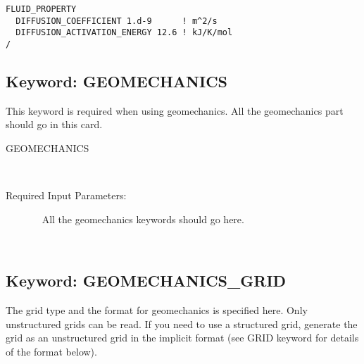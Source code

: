 \begin{mdframed}

\begin{verbatim}
FLUID_PROPERTY
  DIFFUSION_COEFFICIENT 1.d-9      ! m^2/s
  DIFFUSION_ACTIVATION_ENERGY 12.6 ! kJ/K/mol
/
\end{verbatim}
\end{mdframed}

\hyperlink{target_key}{\return}


\newpage
\protect\hypertarget{target_geomech}{}
 
\subsection{Keyword: GEOMECHANICS}

 This keyword is required when using geomechanics. All the geomechanics part should go in this card.

\begin{description}
\item[GEOMECHANICS]~
\item[Required Input Parameters:]~
All the geomechanics keywords  should go here.
\item[\keyend] ~

\end{description}
%

\newpage
\protect\hypertarget{target_geomech_grid}{}
 
\subsection{Keyword: GEOMECHANICS\_GRID}

 The grid type and the format for geomechanics is specified here.
Only unstructured grids can be read. If you need to use a structured grid, generate the grid as an unstructured grid in the implicit format (see GRID keyword for details of the format below).

